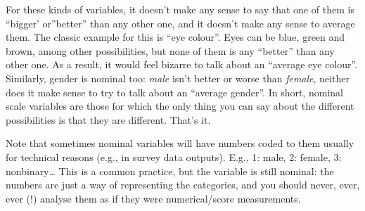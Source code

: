 \documentclass[
  11pt,
  a4paper,
  twoside,symmetric,openright]{book}
\theoremstyle{break}
\theoremstyle{break}
\begin{document}
For these kinds of variables, it doesn't make any sense to say that one of them is ``bigger' or''better'' than any other one, and it doesn't make any sense to average them. The classic example for this is ``eye colour''. Eyes can be blue, green and brown, among other possibilities, but none of them is any ``better'' than any other one. As a result, it would feel bizarre to talk about an ``average eye colour''. Similarly, gender is nominal too: \emph{male} isn't better or worse than \emph{female}, neither does it make sense to try to talk about an ``average gender''. In short, nominal scale variables are those for which the only thing you can say about the different possibilities is that they are different. That's it.

Note that sometimes nominal variables will have numbers coded to them usually for technical reasons (e.g., in survey data outputs). E.g., 1: male, 2: female, 3: nonbinary\ldots{} This is a common practice, but the variable is still nominal: the numbers are just a way of representing the categories, and you should never, ever, ever (!) analyse them as if they were numerical/score measurements.
\end{document}
